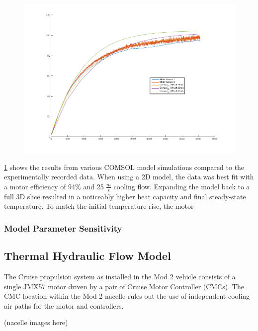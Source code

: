 \documentclass[]{aiaa-tc}%
\begin{document}
\begin{figure}[!h]%
	\centering
	\includegraphics[width=1.0\textwidth]{figures/Temp_motor_1012_0929.png}
	\caption{}
	\label{fig:COMSOLresults}
\end{figure}

\ref{fig:COMSOLresults} shows the results from various COMSOL model simulations compared to the experimentally recorded data. When using a 2D model, the data was best fit with a motor efficiency of 94\% and 25 $\frac{m}{s}$ cooling flow. Expanding the model back to a full 3D slice resulted in a noticeably higher heat capacity and final steady-state temperature. To match the initial temperature rise, the motor

\subsubsection{Model Parameter Sensitivity}


\subsection{Thermal Hydraulic Flow Model}

The Cruise propulsion system as installed in the Mod 2 vehicle consists of a single JMX57 motor driven by a pair of Cruise Motor Controller (CMCs).  The CMC location within the Mod 2 nacelle rules out the use of independent cooling air paths for the motor and controllers.  

(nacelle images here)
\end{document}
